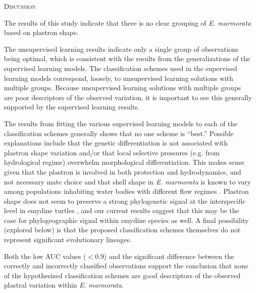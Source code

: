 \documentclass[12pt,letterpaper]{article}
\renewcommand{\section}[1]{%
\bigskip
\begin{center}
\begin{Large}
\normalfont\scshape #1
\medskip
\end{Large}
\end{center}}
\begin{document}
\section{Discussion}

The results of this study indicate that there is no clear grouping of \textit{E. marmorata} based on plastron shape.

The unsupervised learning results indicate only a single group of observations being optimal, which is consistent with the results from the generalizations of the supervised learning models. The classification schemes used in the supervised learning models correspond, loosely, to unsupervised learning solutions with multiple groups. Because unsupervised learning solutions with multiple groups are poor descriptors of the observed variation, it is important to see this generally supported by the supervised learning results.

The results from fitting the various supervised learning models to each of the classification schemes generally shows that no one scheme is ``best.'' Possible explanations include that the genetic differentiation is not associated with plastron shape variation and/or that local selective pressures (e.g. from hydrological regime) overwhelm morphological differentiation. This makes sense given that the plastron is involved in both protection and hydrodynamics, and not necessary mate choice \citep{Rivera2008,Rivera2011,Stayton2011,Rivera2014} and that shell shape in \textit{E. marmorata} is known to vary among populations inhabiting water bodies with different flow regimes \citep{Holland1992,Lubcke2007,Germano2009}. Plastron shape does not seem to preserve a strong phylogenetic signal at the interspecific level in emydine turtles \citep{Angielczyk2011}, and our current results suggest that this may be the case for phylogeographic signal within emydine species as well. A final possibility (explored below) is that the proposed classification schemes themselves do not represent significant evolutionary lineages.

Both the low AUC values (\(< 0.9\)) and the significant difference between the correctly and incorrectly classified observations support the conclusion that none of the hypothesized classification schemes are good descriptors of the observed plastral variation within \textit{E. marmorata}.
\end{document}
